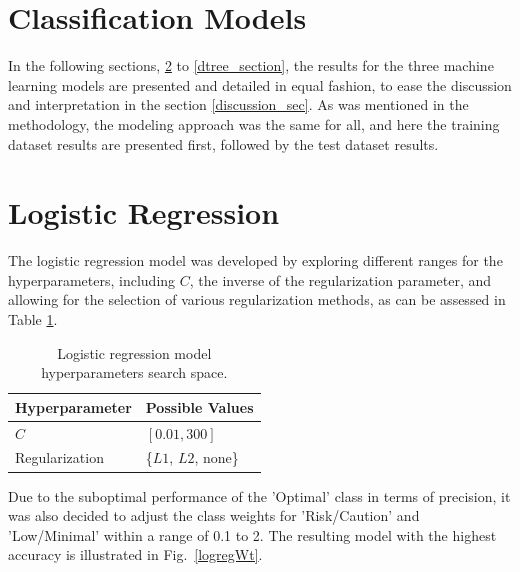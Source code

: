 \documentclass[conference]{IEEEtran}
\begin{document}
\section{Classification Models}

In the following sections, \ref{logreg_section} to \ref{dtree_section}, the results for the three machine learning models are presented and detailed in equal fashion, to ease the discussion and interpretation in the section \ref{discussion_sec}. As was mentioned in the methodology, the modeling approach was the same for all, and here the training dataset results are presented first, followed by the test dataset results.

\section{Logistic Regression} \label{logreg_section}

The logistic regression model was developed by exploring different ranges for the hyperparameters, including $C$, the inverse of the regularization parameter, and allowing for the selection of various regularization methods, as can be assessed in Table \ref{parametrosLogReg}.

\begin{table}[H]
\centering
\caption{Logistic regression model hyperparameters search space.}
\label{parametrosLogReg}
\begin{tabular}{ll}
\toprule
\textbf{Hyperparameter} & \textbf{Possible Values} \\
\midrule
$C$ & $[0.01, 300]$ \\ 
Regularization & \{$L1$, $L2$, none\} \\
\bottomrule
\end{tabular}
\end{table} %

Due to the suboptimal performance of the 'Optimal' class in terms of precision, it was also decided to adjust the class weights for 'Risk/Caution' and 'Low/Minimal' within a range of 0.1 to 2. The resulting model with the highest accuracy is illustrated in Fig.~\ref{logregWt}.
\end{document}
